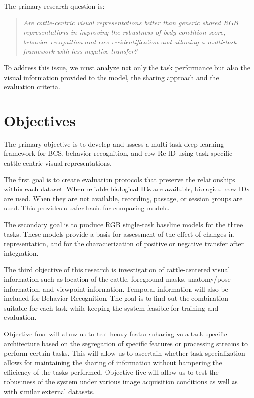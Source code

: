 The primary research question is:
\begin{quote}
\textit{Are cattle-centric visual representations better than generic shared RGB representations in improving the robustness of body condition score, behavior recognition and cow re-identification and allowing a multi-task framework with less negative transfer?}
\end{quote}
To address this issue, we must analyze not only the task performance but also the visual information provided to the model, the sharing approach and the evaluation criteria.

\section{Objectives}

The primary objective is to develop and assess a multi-task deep learning framework for BCS, behavior recognition, and cow Re-ID using task-specific cattle-centric visual representations.

The first goal is to create evaluation protocols that preserve the relationships within each dataset. When reliable biological IDs are available, biological cow IDs are used. When they are not available, recording, passage, or session groups are used. This provides a safer basis for comparing models.

The secondary goal is to produce RGB single-task baseline models for the three tasks. These models provide a basis for assessment of the effect of changes in representation, and for the characterization of positive or negative transfer after integration.

The third objective of this research is investigation of cattle-centered visual information such as location of the cattle, foreground masks, anatomy/pose information, and viewpoint information. Temporal information will also be included for Behavior Recognition. The goal is to find out the combination suitable for each task while keeping the system feasible for training and evaluation.

Objective four will allow us to test heavy feature sharing vs a task-specific architecture based on the segregation of specific features or processing streams to perform certain tasks. This will allow us to ascertain whether task specialization allows for maintaining the sharing of information without hampering the efficiency of the tasks performed. Objective five will allow us to test the robustness of the system under various image acquisition conditions as well as with similar external datasets.

